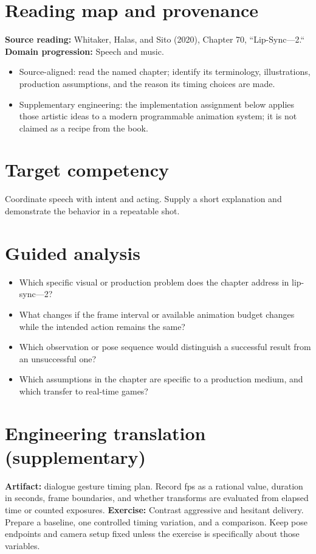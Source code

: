 \documentclass[10pt,letterpaper]{article}
\begin{document}
\makedoctitle
\makedocsummary

\section{Reading map and provenance}
\textbf{Source reading:} Whitaker, Halas, and Sito (2020), Chapter 70, ``Lip-Sync—2.``\\
\textbf{Domain progression:} Speech and music.
\begin{itemize}
\item Source-aligned: read the named chapter; identify its terminology, illustrations, production assumptions, and the reason its timing choices are made.
\item Supplementary engineering: the implementation assignment below applies those artistic ideas to a modern programmable animation system; it is not claimed as a recipe from the book.
\end{itemize}
\section{Target competency}
Coordinate speech with intent and acting. Supply a short explanation and demonstrate the behavior in a repeatable shot.
\section{Guided analysis}
\begin{itemize}
\item Which specific visual or production problem does the chapter address in lip-sync—2?
\item What changes if the frame interval or available animation budget changes while the intended action remains the same?
\item Which observation or pose sequence would distinguish a successful result from an unsuccessful one?
\item Which assumptions in the chapter are specific to a production medium, and which transfer to real-time games?
\end{itemize}
\section{Engineering translation (supplementary)}
\textbf{Artifact:} dialogue gesture timing plan. Record fps as a rational value, duration in seconds, frame boundaries, and whether transforms are evaluated from elapsed time or counted exposures.
\textbf{Exercise:} Contrast aggressive and hesitant delivery. Prepare a baseline, one controlled timing variation, and a comparison. Keep pose endpoints and camera setup fixed unless the exercise is specifically about those variables.
\end{document}
